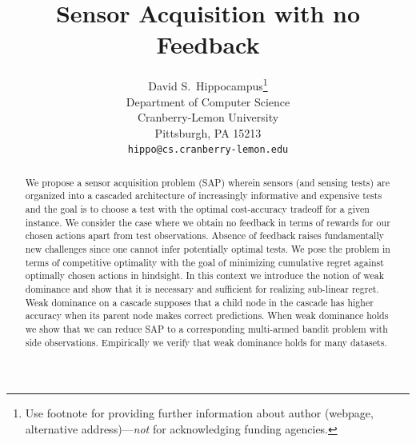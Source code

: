 \documentclass{article}
\title{Sensor Acquisition with no Feedback}
\author{
	David S.~Hippocampus\thanks{Use footnote for providing further
		information about author (webpage, alternative
		address)---\emph{not} for acknowledging funding agencies.} \\
	Department of Computer Science\\
	Cranberry-Lemon University\\
	Pittsburgh, PA 15213 \\
	\texttt{hippo@cs.cranberry-lemon.edu} \\
}
\begin{document}
	
	\maketitle
	
	\begin{abstract}
		We propose a sensor acquisition problem (SAP) wherein sensors (and sensing tests) are organized into a cascaded architecture of increasingly informative and expensive tests and the goal is to choose a test with the optimal cost-accuracy tradeoff for a given instance. We consider the case where we obtain no feedback in terms of rewards for our chosen actions apart from test observations. Absence of feedback raises fundamentally new challenges since one cannot infer potentially optimal tests. We pose the problem in terms of competitive optimality with the goal of minimizing cumulative regret against optimally chosen actions in hindsight. In this context we introduce the notion of weak dominance and show that it is necessary and sufficient for realizing sub-linear regret. Weak dominance on a cascade supposes that a child node in the cascade has higher accuracy when its parent node makes correct predictions. When weak dominance holds we show that we can reduce SAP to a corresponding multi-armed bandit problem with side observations. Empirically we verify that weak dominance holds for many datasets.
	\end{abstract}
\end{document}
